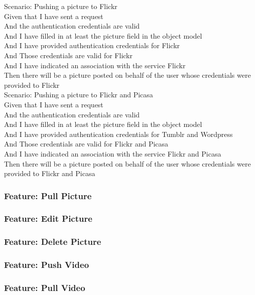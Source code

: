 \documentclass[12pt]{article}
\begin{document}
Scenario: Pushing a picture to Flickr \\
	Given that I have sent a request \\
	And the authentication credentials are valid \\
	And I have filled in at least the picture field in the object model \\
	And I have provided authentication credentials for Flickr \\ 
	And Those credentials are valid for Flickr \\ 
	And I have indicated an association with the service Flickr \\
	Then there will be a picture posted on behalf of the user whose credentials 
	were provided to Flickr \\

Scenario: Pushing a picture to Flickr and Picasa \\
	Given that I have sent a request \\
	And the authentication credentials are valid \\
	And I have filled in at least the picture field in the object model \\
	And I have provided authentication credentials for Tumblr and Wordpress \\ 
	And Those credentials are valid for Flickr and Picasa \\ 
	And I have indicated an association with the service Flickr and Picasa \\
	Then there will be a picture posted on behalf of the user whose credentials 
	were provided to Flickr and Picasa \\
\subsubsection{Feature: Pull Picture}
\subsubsection{Feature: Edit Picture}
\subsubsection{Feature: Delete Picture}

\subsubsection{Feature: Push Video}
\subsubsection{Feature: Pull Video}
\end{document}
